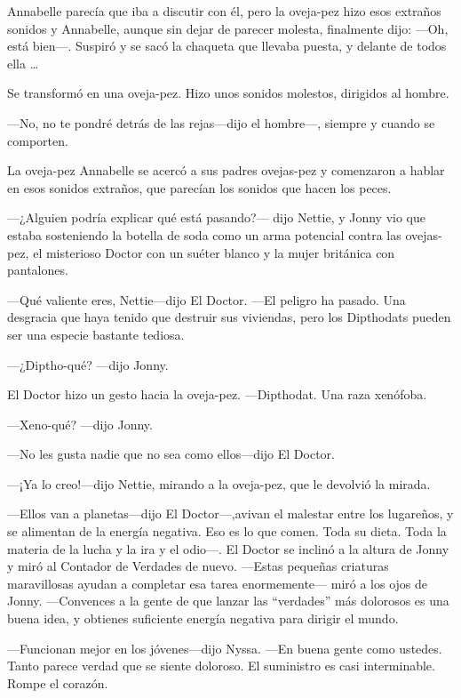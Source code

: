 Annabelle parecía que iba a discutir con él, pero la oveja-pez hizo esos
extraños sonidos y Annabelle, aunque sin dejar de parecer molesta,
finalmente dijo: ---Oh, está bien---. Suspiró y se sacó la chaqueta que
llevaba puesta, y delante de todos ella \ldots{}

Se transformó en una oveja-pez. Hizo unos sonidos molestos, dirigidos al
hombre.

---No, no te pondré detrás de las rejas---dijo el hombre---, siempre y
cuando se comporten.

La oveja-pez Annabelle se acercó a sus padres ovejas-pez y comenzaron a
hablar en esos sonidos extraños, que parecían los sonidos que hacen los
peces.

---¿Alguien podría explicar qué está pasando?--- dijo Nettie, y Jonny
vio que estaba sosteniendo la botella de soda como un arma potencial
contra las ovejas-pez, el misterioso Doctor con un suéter blanco y la
mujer británica con pantalones.

---Qué valiente eres, Nettie---dijo El Doctor. ---El peligro ha pasado.
Una desgracia que haya tenido que destruir sus viviendas, pero los
Dipthodats pueden ser una especie bastante tediosa.

---¿Diptho-qué? ---dijo Jonny.

El Doctor hizo un gesto hacia la oveja-pez. ---Dipthodat. Una raza
xenófoba.

---Xeno-qué? ---dijo Jonny.

---No les gusta nadie que no sea como ellos---dijo El Doctor.

---¡Ya lo creo!---dijo Nettie, mirando a la oveja-pez, que le devolvió
la mirada.

---Ellos van a planetas---dijo El Doctor---,avivan el malestar entre los
lugareños, y se alimentan de la energía negativa. Eso es lo que comen.
Toda su dieta. Toda la materia de la lucha y la ira y el odio---. El
Doctor se inclinó a la altura de Jonny y miró al Contador de Verdades de
nuevo. ---Estas pequeñas criaturas maravillosas ayudan a completar esa
tarea enormemente--- miró a los ojos de Jonny. ---Convences a la gente
de que lanzar las ``verdades'' más dolorosos es una buena idea, y
obtienes suficiente energía negativa para dirigir el mundo.

---Funcionan mejor en los jóvenes---dijo Nyssa. ---En buena gente como
ustedes. Tanto parece verdad que se siente doloroso. El suministro es
casi interminable. Rompe el corazón.

~

